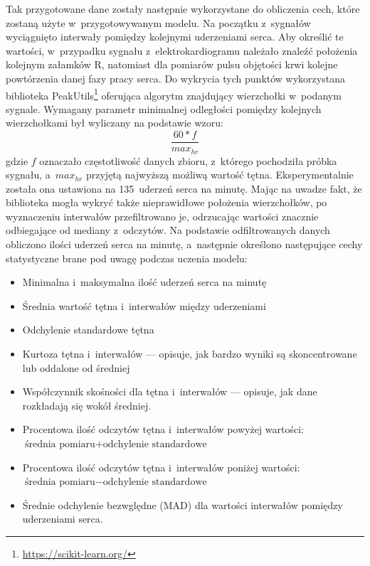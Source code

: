 Tak przygotowane dane zostały następnie wykorzystane do obliczenia cech, które zostaną użyte w~przygotowywanym modelu. Na początku z~sygnałów wyciągnięto interwały pomiędzy kolejnymi uderzeniami serca. Aby określić te wartości, w~przypadku sygnału z~elektrokardiogramu należało znaleźć położenia kolejnym załamków R, natomiast dla pomiarów pulsu objętości krwi kolejne powtórzenia danej fazy pracy serca. Do wykrycia tych punktów wykorzystana biblioteka PeakUtils\footnote{\url{https://scikit-learn.org/}} oferująca algorytm znajdujący wierzchołki w~podanym sygnale. Wymagany parametr minimalnej odległości pomiędzy kolejnych wierzchołkami był wyliczany na podstawie wzoru:
$$
\frac{60*f}{max_{hr}}
$$
gdzie $f$ oznaczało częstotliwość danych zbioru, z~którego pochodziła próbka sygnału, a~$max_{hr}$ przyjętą najwyższą możliwą wartość tętna. Eksperymentalnie została ona ustawiona na 135~uderzeń serca na minutę. Mając na uwadze fakt, że biblioteka mogła wykryć także nieprawidłowe położenia wierzchołków, po wyznaczeniu interwałów przefiltrowano je, odrzucając wartości znacznie odbiegające od mediany z~odczytów. Na podstawie odfiltrowanych danych obliczono ilości uderzeń serca na minutę, a~następnie określono następujące cechy statystyczne brane pod uwagę podczas uczenia modelu:
\begin{itemize}
	\item Minimalna i~maksymalna ilość uderzeń serca na minutę
	\item Średnia wartość tętna i~interwałów między uderzeniami
	\item Odchylenie standardowe tętna
	\item Kurtoza tętna i~interwałów --- opisuje, jak bardzo wyniki są skoncentrowane lub oddalone od średniej
	\item Współczynnik skośności dla tętna i~interwałów --- opisuje, jak dane rozkładają się wokół średniej.
	\item Procentowa ilość odczytów tętna i~interwałów powyżej wartości: $\text{średnia pomiaru} + \text{odchylenie standardowe}$
	\item Procentowa ilość odczytów  tętna i~interwałów poniżej wartości: $\text{średnia pomiaru} - \text{odchylenie standardowe}$
	\item Średnie odchylenie bezwględne (MAD) dla wartości interwałów pomiędzy uderzeniami serca.
\end{itemize}

